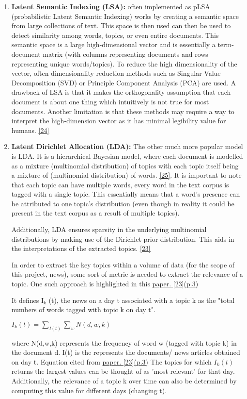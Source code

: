 \begin{enumerate}
    \item \textbf{Latent Semantic Indexing (LSA):} often implemented as pLSA (probabilistic Latent Semantic Indexing) works by creating a semantic space from large collections of text. This space is then used can then be used to detect similarity among words, topics, or even entire documents. This semantic space is a large high-dimensional vector and is essentially a term-document matrix (with columns representing documents and rows representing unique words/topics). To reduce the high dimensionality of the vector, often dimensionality reduction methods such as Singular Value Decomposition (SVD) or Principle Component Analysis (PCA) are used. A drawback of LSA is that it makes the orthogonality assumption that each document is about one thing which intuitively is not true for most documents. Another limitation is that these methods may require a way to interpret the high-dimension vector as it has minimal legibility value for humans. \hyperlink{24}{[24]} 
    
    \item \textbf{Latent Dirichlet Allocation (LDA):} The other much more popular model is LDA. It is a hierarchical Bayesian model, where each document is modelled as a mixture (multinomial distribution) of topics with each topic itself being a mixture of (multinomial distribution) of words.  \hyperlink{25}{[25]}. It is important to note that each topic can have multiple words, every word in the text corpus is tagged with a single topic. This essentially means that a word's presence can be attributed to one topic's distribution (even though in reality it could be present in the text corpus as a result of multiple topics). 
    
    Additionally, LDA ensures sparsity in the underlying multinomial distributions by making use of the Dirichlet prior distribution. This aids in the interpretations of the extracted topics. \hyperlink{23}{[23]}
    
    In order to extract the key topics within a volume of data (for the scope of this project, news), some sort of metric is needed to extract the relevance of a topic.   
One such approach is highlighted in this \hyperlink{23}{paper. [23](p.3)} 

It defines I$_{k}$ (t), the news on a day t associated with a topic k as the  "total numbers of words tagged with topic k on day t". 

\begin{center}
    $ I_{k} (t) = \sum_{I(t)} \sum_{w} N (d, w, k) $
\end{center}

where N(d,w,k) represents the frequency of word w (tagged with topic k) in the document d. I(t) is the represents the documents/ news articles obtained on day t. Equation cited from \hyperlink{23}{paper. [23](p.3)} The topics for which $I_{k} (t)$ returns the largest values can be thought of as 'most relevant' for that day. Additionally, the relevance of a topic k over time can also be determined by computing this value for different days (changing t).

    
\end{enumerate}

